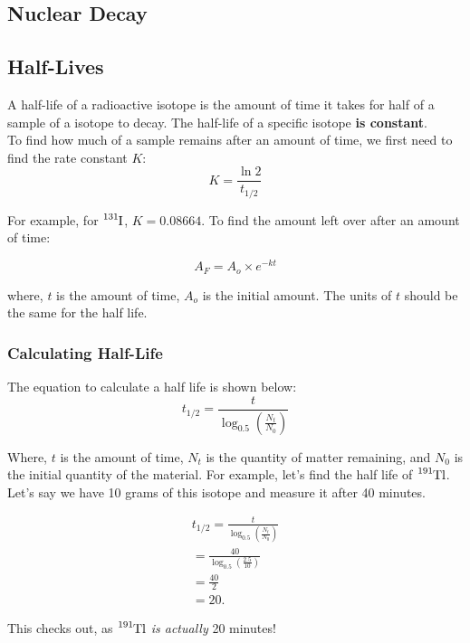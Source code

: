 \documentclass{article}
\begin{document}
\begin{multicols*}{2}
    
    \section{Nuclear Decay}
    \subsection{Half-Lives}
    A half-life of a radioactive isotope is the amount of time it takes for
    half of a sample of a isotope to decay. The half-life of a specific
    isotope \textbf{is constant}.\\

    To find how much of a sample remains after an amount of time, we first
    need to find the rate constant $K$:
    \[
      K = \frac{\ln 2}{t_{1/2}}
    \]

    For example, for $\ce{^{131}I}$, $K=0.08664$. To find the amount left
    over after an amount of time:

    \[
      A_F = A_o \times e^{-kt}
    \]

    where, $t$ is the amount of time, $A_o$ is the initial amount. The units
    of $t$ should be the same for the half life.

    \subsubsection{Calculating Half-Life}
    The equation to calculate a half life is shown below:
    \[
      t_{1/2} = \frac{t}{ \log_{0.5}\left( \frac{N_t}{N_0} \right) }
    \]

    Where, $t$ is the amount of time, $N_t$ is the quantity of matter remaining,
    and $N_0$ is the initial quantity of the material. For example, let's find
    the half life of $\ce{^{191}Tl}$. Let's say we have 10 grams of this isotope
    and measure it after 40 minutes.

    \begin{equation*}
      \begin{split}
        t_{1/2} = \frac{t}{ \log_{0.5}\left( \frac{N_t}{N_0} \right) } \\
        = \frac{40}{ \log_{0.5}\left( \frac{2.5}{10} \right) } \\
        = \frac{40}{2} \\
        = 20.
      \end{split}
    \end{equation*}
    
    This checks out, as $\ce{^{191}Tl}$ \textit{is actually} 20 minutes!

\end{multicols*}
\end{document}
